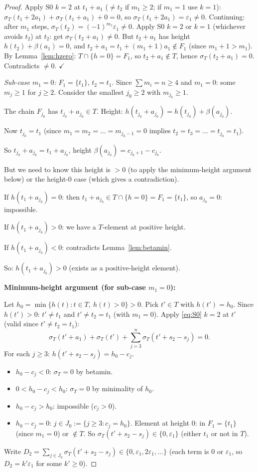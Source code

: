 \begin{proof}
Apply S0 $k=2$ at $t_1+a_1$ ($\neq t_2$ if $m_1 \geq 2$; if $m_1=1$ use $k=1$):
$\sigma_T(t_1+2a_1)+\sigma_T(t_1+a_1)+0=0$, so $\sigma_T(t_1+2a_1)=\varepsilon_1\neq 0$.
Continuing: after $m_1$ steps, $\sigma_T(t_2)=(-1)^{m_1}\varepsilon_1\neq 0$.
Apply S0 $k=2$ or $k=1$ (whichever avoids $t_2$) at $t_2$: get $\sigma_T(t_2+a_1)\neq 0$.
But $t_2+a_1$ has height $h(t_2)+\beta(a_1)=0$, and $t_2+a_1 = t_1+(m_1+1)a_1 \notin F_1$
(since $m_1+1 > m_1$).  By Lemma~\ref{lem:hzero}: $T\cap\{h=0\}=F_1$, so $t_2+a_1\notin T$,
hence $\sigma_T(t_2+a_1)=0$.  Contradicts $\neq 0$. $\checkmark$

\medskip
\noindent\emph{Sub-case $m_1=0$:}
$F_1=\{t_1\}$, $t_2=t_1$.  Since $\sum m_i = n \geq 4$ and $m_1=0$: some $m_j \geq 1$
for $j \geq 2$.  Consider the smallest $j_0 \geq 2$ with $m_{j_0} \geq 1$.

The chain $F_{j_0}$ has $t_{j_0}+a_{j_0} \in T$.
Height: $h(t_{j_0}+a_{j_0}) = h(t_{j_0})+\beta(a_{j_0})$.

Now $t_{j_0} = t_1$ (since $m_1 = m_2 = \ldots = m_{j_0-1} = 0$ implies
$t_2 = t_3 = \ldots = t_{j_0} = t_1$).

So $t_{j_0}+a_{j_0} = t_1+a_{j_0}$, height $\beta(a_{j_0}) = c_{j_0+1}-c_{j_0}$.

But we need to know this height is $>0$ (to apply the minimum-height argument below)
or the height-0 case (which gives a contradiction).

If $h(t_1+a_{j_0}) = 0$: then $t_1+a_{j_0} \in T\cap\{h=0\}=F_1=\{t_1\}$,
so $a_{j_0}=0$: impossible.

If $h(t_1+a_{j_0}) > 0$: we have a $T$-element at positive height.

If $h(t_1+a_{j_0}) < 0$: contradicts Lemma~\ref{lem:betamin}.

So: $h(t_1+a_{j_0}) > 0$ (exists as a positive-height element).

\medskip
\noindent\textbf{Minimum-height argument (for sub-case $m_1=0$):}

Let $h_0 = \min\{h(t) : t \in T,\ h(t) > 0\} > 0$.
Pick $t' \in T$ with $h(t') = h_0$.
Since $h(t') > 0$: $t' \neq t_1$ and $t' \neq t_2 = t_1$ (with $m_1=0$).
Apply \eqref{eq:S0} $k=2$ at $t'$ (valid since $t' \neq t_2=t_1$):
\[
  \sigma_T(t'+a_1) + \sigma_T(t') + \sum_{j=3}^n \sigma_T(t'+s_2-s_j) = 0.
\]
For each $j \geq 3$: $h(t'+s_2-s_j) = h_0 - c_j$.
\begin{itemize}
\item $h_0-c_j < 0$: $\sigma_T=0$ by betamin.
\item $0 < h_0-c_j < h_0$: $\sigma_T=0$ by minimality of $h_0$.
\item $h_0-c_j > h_0$: impossible ($c_j>0$).
\item $h_0-c_j = 0$: $j \in J_0 := \{j \geq 3 : c_j=h_0\}$.
  Element at height $0$: in $F_1=\{t_1\}$ (since $m_1=0$) or $\notin T$.
  So $\sigma_T(t'+s_2-s_j) \in \{0, \varepsilon_1\}$ (either $t_1$ or not in $T$).
\end{itemize}
Write $D_2 = \sum_{j\in J_0} \sigma_T(t'+s_2-s_j) \in \{0, \varepsilon_1, 2\varepsilon_1, \ldots\}$
(each term is $0$ or $\varepsilon_1$, so $D_2 = k'\varepsilon_1$ for some $k' \geq 0$).


\end{proof}

